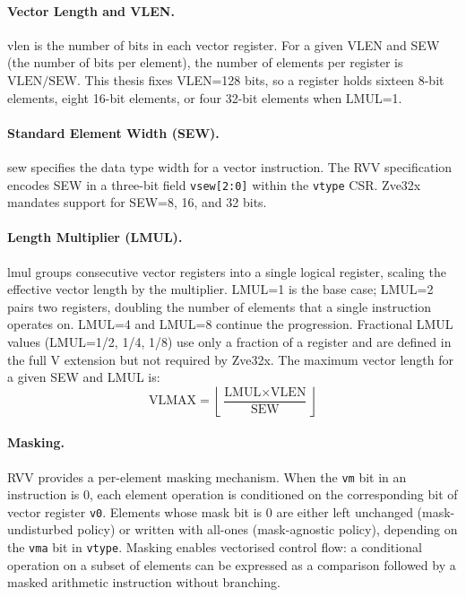 \paragraph{Vector Length and VLEN.}
\gls{vlen} is the number of bits in each vector register. For a given VLEN and SEW
(the number of bits per element), the number of elements per register is
$\text{VLEN} / \text{SEW}$. This thesis fixes VLEN=128 bits, so a register holds
sixteen 8-bit elements, eight 16-bit elements, or four 32-bit elements when LMUL=1.

\paragraph{Standard Element Width (SEW).}
\gls{sew} specifies the data type width for a vector instruction. The RVV specification
encodes SEW in a three-bit field \texttt{vsew[2:0]} within the \texttt{vtype} CSR.
Zve32x mandates support for SEW=8, 16, and 32 bits.

\paragraph{Length Multiplier (LMUL).}
\gls{lmul} groups consecutive vector registers into a single logical register, scaling
the effective vector length by the multiplier. LMUL=1 is the base case; LMUL=2 pairs
two registers, doubling the number of elements that a single instruction operates on.
LMUL=4 and LMUL=8 continue the progression. Fractional LMUL values (LMUL=1/2, 1/4,
1/8) use only a fraction of a register and are defined in the full V extension but not
required by Zve32x. The maximum vector length for a given SEW and LMUL is:
\begin{equation}
  \text{VLMAX} = \left\lfloor \frac{\text{LMUL} \times \text{VLEN}}{\text{SEW}} \right\rfloor
  \label{eq:vlmax}
\end{equation}

\paragraph{Masking.}
RVV provides a per-element masking mechanism. When the \texttt{vm} bit in an instruction
is 0, each element operation is conditioned on the corresponding bit of vector register
\texttt{v0}. Elements whose mask bit is 0 are either left unchanged (mask-undisturbed
policy) or written with all-ones (mask-agnostic policy), depending on the \texttt{vma}
bit in \texttt{vtype}. Masking enables vectorised control flow: a conditional operation
on a subset of elements can be expressed as a comparison followed by a masked arithmetic
instruction without branching.


